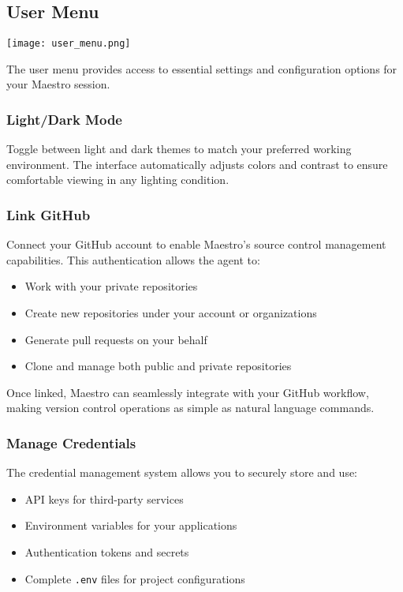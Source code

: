 \subsection*{User Menu}

\begin{center}
\texttt{[image: user\_menu.png]}
\end{center}

The user menu provides access to essential settings and configuration options for your Maestro session.

\subsubsection*{Light/Dark Mode}

Toggle between light and dark themes to match your preferred working environment. The interface automatically adjusts colors and contrast to ensure comfortable viewing in any lighting condition.

\subsubsection*{Link GitHub}

Connect your GitHub account to enable Maestro's source control management capabilities. This authentication allows the agent to:
\begin{itemize}
    \item Work with your private repositories
    \item Create new repositories under your account or organizations
    \item Generate pull requests on your behalf
    \item Clone and manage both public and private repositories
\end{itemize}

Once linked, Maestro can seamlessly integrate with your GitHub workflow, making version control operations as simple as natural language commands.

\subsubsection*{Manage Credentials}

The credential management system allows you to securely store and use:
\begin{itemize}
    \item API keys for third-party services
    \item Environment variables for your applications
    \item Authentication tokens and secrets
    \item Complete \texttt{.env} files for project configurations
\end{itemize}

